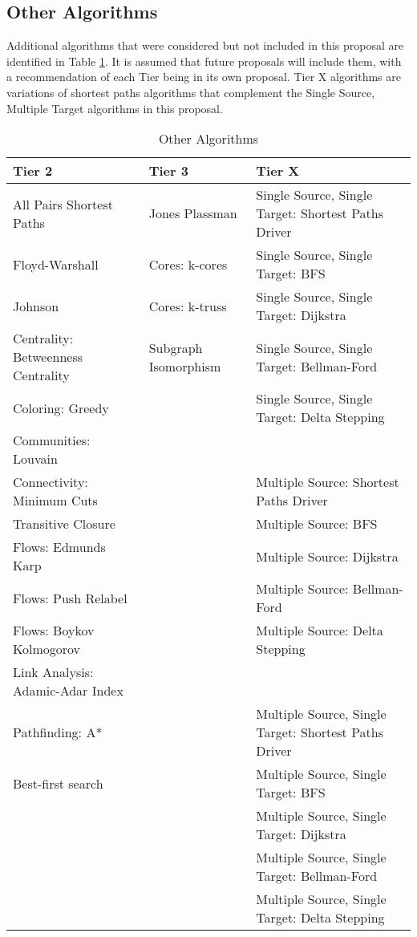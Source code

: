 \subsection{Other Algorithms}
Additional algorithms that were considered but not included in this proposal are identified in Table \ref{tab:other_algorithms}. 
It is assumed that future proposals will include them, with a recommendation of each Tier being in its own proposal.
Tier X algorithms are variations of shortest paths algorithms that complement the Single Source, Multiple Target algorithms 
in this proposal.


\begin{table}[h!]
\begin{center}
{\begin{tabular}{l|l|l}
\hline
    \textbf{Tier 2} & \textbf{Tier 3} & \textbf{Tier X} \\
\hline
    All Pairs Shortest Paths & Jones Plassman & Single Source, Single Target: Shortest Paths Driver\\
    Floyd-Warshall & Cores: k-cores & Single Source, Single Target: BFS \\
    Johnson & Cores: k-truss & Single Source, Single Target: Dijkstra \\
    Centrality: Betweenness Centrality & Subgraph Isomorphism & Single Source, Single Target: Bellman-Ford \\
    Coloring: Greedy & & Single Source, Single Target: Delta Stepping \\
    Communities: Louvain & &  \\
    Connectivity: Minimum Cuts & & Multiple Source: Shortest Paths Driver \\
    Transitive Closure & & Multiple Source: BFS \\
    Flows: Edmunds Karp & & Multiple Source: Dijkstra \\
    Flows: Push Relabel & & Multiple Source: Bellman-Ford \\
    Flows: Boykov Kolmogorov & & Multiple Source: Delta Stepping \\
    Link Analysis: Adamic-Adar Index & &  \\
    Pathfinding: A* & & Multiple Source, Single Target: Shortest Paths Driver\\
    Best-first search & & Multiple Source, Single Target: BFS \\
    & & Multiple Source, Single Target: Dijkstra \\
    & & Multiple Source, Single Target: Bellman-Ford \\
    & & Multiple Source, Single Target: Delta Stepping \\
\hline
\end{tabular}}
\caption{Other Algorithms}
\label{tab:other_algorithms}
\end{center}
\end{table}

